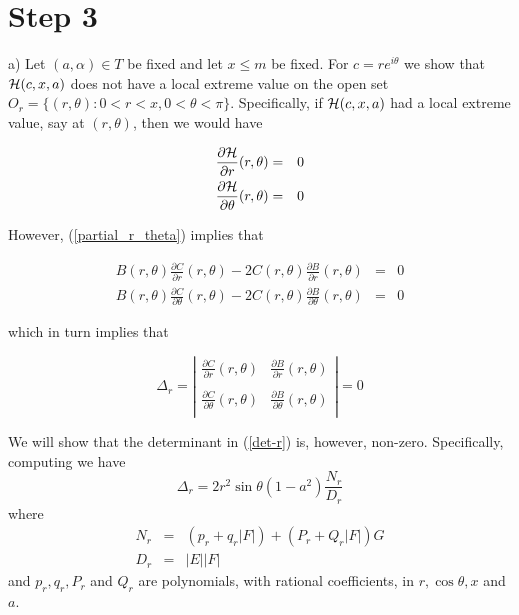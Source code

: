\documentclass[12pt]{article}
\begin{document}
\vspace{0.2in}

\section{Step 3}

a) Let $(a,\alpha) \in T$ be fixed and let $x \le m$ be fixed.  For $c = re^{i\theta}$ we show that ${\cal H}(c,x,a)$ does not have a local extreme value on the open 
set $O_r = \{(r,\theta) : 0 < r < x, 0 < \theta < \pi \}$.  Specifically, if ${\cal H}(c,x,a)$ had a local extreme value, say at $(r,\theta)$, then
we would have 

\begin{eqnarray} \label{partial_r_theta}
\frac{\partial {\cal H}}{\partial r}{(r,\theta)} &=& 0 \\ \nonumber
\frac{\partial {\cal H}}{\partial \theta}{(r,\theta)} &=& 0
\end{eqnarray}

However, (\ref{partial_r_theta}) implies that 

\begin{eqnarray*} 
B(r,\theta)\frac{\partial {C}}{\partial r}{(r,\theta)} - 2C(r,\theta)\frac{\partial {B}}{\partial r}{(r,\theta)}&=& 0 \\ \nonumber
B(r,\theta)\frac{\partial {C}}{\partial \theta}{(r,\theta)} - 2C(r,\theta)\frac{\partial {B}}{\partial \theta}{(r,\theta)}&=& 0 
\end{eqnarray*}

which in turn implies that 

\begin{equation} \label{det-r}
\Delta_r = \left |
\begin{array}{ll}
\frac{\partial {C}}{\partial r}{(r,\theta)} & \frac{\partial {B}}{\partial r}{(r,\theta)} \\
& \\
\frac{\partial {C}}{\partial \theta}{(r,\theta)} & \frac{\partial {B}}{\partial \theta}{(r,\theta)} \\
\end{array}
\right | = 0
\end{equation}

We will show that the determinant in (\ref{det-r}) is, however, non-zero.  Specifically, computing we have
$$
\Delta_r = 2 r^2 \sin \theta (1-a^2) \frac{N_r}{D_r} 
$$
where
\begin{eqnarray*}
N_r &=& (p_r + q_r |F|) + (P_r + Q_r |F|)G \\
D_r &=& |E| |F|
\end{eqnarray*}
and $p_r, q_r, P_r$ and $Q_r$ are polynomials, with rational coefficients, in $r, \cos \theta, x$ and $a$.
\end{document}
